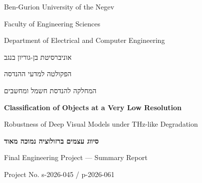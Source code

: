 
\begin{titlepage}
\begin{center}

{\large Ben-Gurion University of the Negev}\par
{\large Faculty of Engineering Sciences}\par
{\large Department of Electrical and Computer Engineering}\par
\vspace{0.4em}
\begin{hebrew}
{\large אוניברסיטת בן-גוריון בנגב}\par
{\large הפקולטה למדעי ההנדסה}\par
{\large המחלקה להנדסת חשמל ומחשבים}\par
\end{hebrew}

\vfill

{\LARGE\bfseries Classification of Objects at a Very Low Resolution}\par
\vspace{0.4em}
{\Large Robustness of Deep Visual Models under THz-like Degradation}\par
\vspace{0.8em}
\begin{hebrew}
{\LARGE\bfseries סיווג עצמים ברזולוציה נמוכה מאוד}\par
\end{hebrew}

\vspace{1.2em}
{\large Final Engineering Project --- Summary Report}\par
\vspace{0.3em}
{\normalsize Project No. s-2026-045 / p-2026-061}\par


\end{center}
\end{titlepage}
